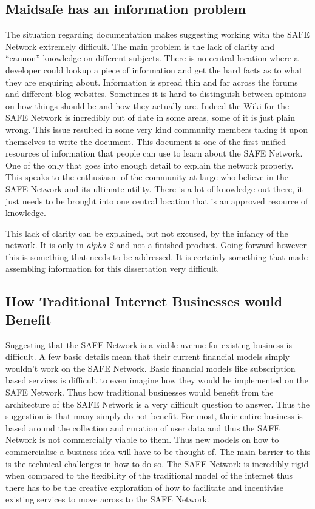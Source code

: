 
\subsection{Maidsafe has an information problem}

The situation regarding documentation makes suggesting working with the SAFE Network extremely difficult. The main problem is the lack of clarity and ``cannon'' knowledge on different subjects. There is no central location where a developer could lookup a piece of information and get the hard facts as to what they are enquiring about. Information is spread thin and far across the forums and different blog websites. Sometimes it is hard to distinguish between opinions on how things should be and how they actually are. Indeed the Wiki for the SAFE Network is incredibly out of date in some areas, some of it is just plain wrong. This issue resulted in some very kind community members taking it upon themselves to write the  document. This document is one of the first unified resources of information that people can use to learn about the SAFE Network. One of the only that goes into enough detail to explain the network properly. This speaks to the enthusiasm of the community at large who believe in the SAFE Network and its ultimate utility. There is a lot of knowledge out there, it just needs to be brought into one central location that is an approved resource of knowledge.

This lack of clarity can be explained, but not excused, by the infancy of the network. It is only in \textit{alpha 2} and not a finished product. Going forward however this is something that needs to be addressed. It is certainly something that made assembling information for this dissertation very difficult.

\subsection{How Traditional Internet Businesses would Benefit}

Suggesting that the SAFE Network is a viable avenue for existing business is difficult. A few basic details mean that their current financial models simply wouldn't work on the SAFE Network. Basic financial models like subscription based services is difficult to even imagine how they would be implemented on the SAFE Network. Thus how traditional businesses  would benefit from the architecture of the SAFE Network is a very difficult question to answer. Thus the suggestion is that many simply do not benefit. For most, their entire business is based around the collection and curation of user data and thus the SAFE Network is not commercially viable to them. Thus new models on how to commercialise a business idea will have to be thought of. The main barrier to this is the technical challenges in how to do so. The SAFE Network is incredibly rigid when compared to the flexibility of the traditional model of the internet thus there has to be the creative exploration of how to facilitate and incentivise existing services to move across to the SAFE Network.

